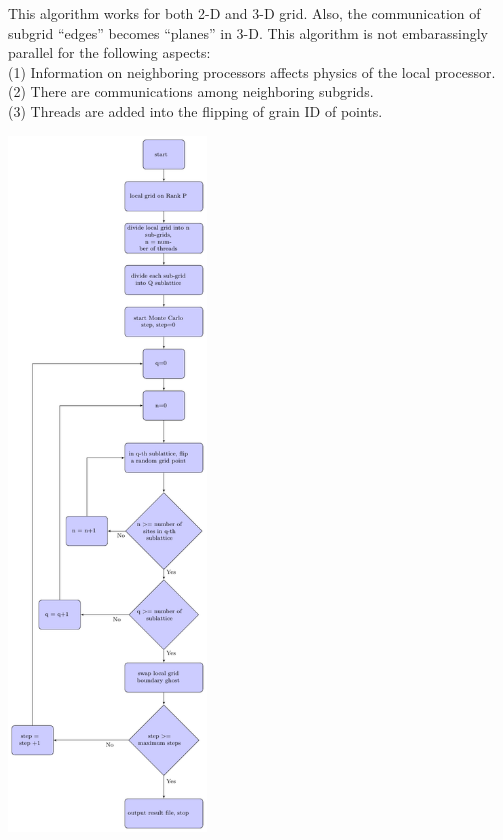 \documentclass[11pt]{article}
\begin{document}
\begin{multicols*}{2}
This algorithm works for both 2-D and 3-D grid. Also, the communication of subgrid ``edges'' becomes ``planes'' in 3-D. 
This algorithm is not embarassingly parallel for the following aspects:\\
(1) Information on neighboring processors affects physics of the local processor. \\
(2) There are communications among neighboring subgrids.\\
(3) Threads are added into the flipping of grain ID of points.

\begin{center}
\begin{minipage}{0.475\textwidth}\centering
  \includegraphics[height=7.25in]{flow_chart.pdf}
\end{minipage}
\end{center}


\end{multicols*}
\end{document}
